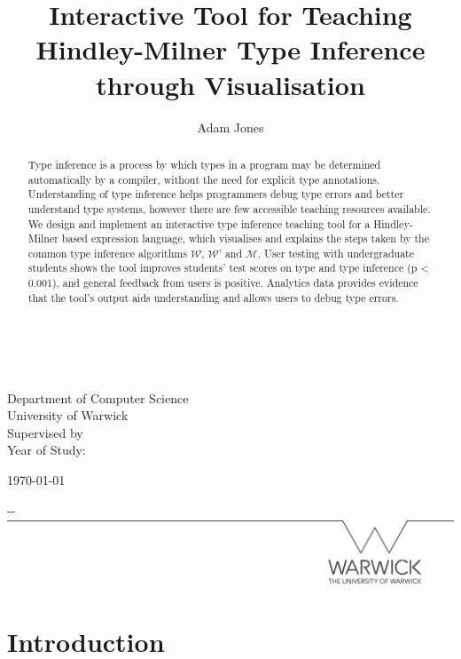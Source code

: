 \documentclass[a4paper,fleqn,oneside,12pt]{report}
\author{Adam Jones}
\title{Interactive Tool for Teaching Hindley-Milner Type Inference through Visualisation}
\makeatletter
\newcommand{\W}{$\mathcal{W}$}
\newcommand{\M}{$\mathcal{M}$}
\newcommand{\@supervisor}[0]{}
\newcommand{\@yearofstudy}[0]{}
\makeatother
\begin{document}
\makeatletter
\begin{titlepage}

	\textbf{\Huge \@title} \\[1.5cm]
    \Large \textbf{\@author} \\
    Department of Computer Science \\
    University of Warwick \\

	Supervised by \@supervisor \\
	Year of Study: \@yearofstudy \\

    \vfill

    \today

    \begin{adjustwidth}{-\oddsidemargin-1in}{-\rightmargin}
        \centering
        \includegraphics[width=\paperwidth]{./line.png}
    \end{adjustwidth}

    \vspace*{-3.5cm}

\end{titlepage}
\makeatother

\pagestyle{plain}

\begin{abstract}
  Type inference is a process by which types in a program may be determined automatically by a compiler, without the need for explicit type annotations. Understanding of type inference helps programmers debug type errors and better understand type systems, however there are few accessible teaching resources available. We design and implement an interactive type inference teaching tool for a Hindley-Milner based expression language, which visualises and explains the steps taken by the common type inference algorithms \W, \W' and \M. User testing with undergraduate students shows the tool improves students' test scores on type and type inference (p < 0.001), and general feedback from users is positive. Analytics data provides evidence that the tool's output aids understanding and allows users to debug type errors.
\end{abstract}

\tableofcontents

\chapter{Introduction}\label{id:h.6k9gcmunzldy}
\end{document}
